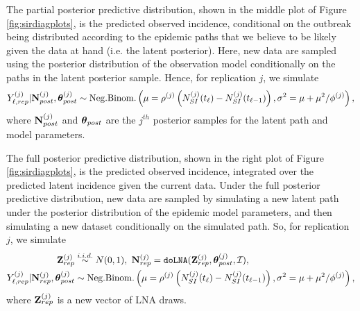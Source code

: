The partial posterior predictive distribution, shown in the middle plot of Figure \ref{fig:sirdiagplots}, is the predicted observed incidence, conditional on the outbreak being distributed according to the epidemic paths that we believe to be likely given the data at hand (i.e. the latent posterior). Here, new data are sampled using the posterior distribution of the observation model conditionally on the paths in the latent posterior sample. Hence, for replication $ j $, we simulate \begin{equation}
\label{eqn:lna_partial_postpred}
Y_{\ell,rep}^{(j)}|\mathbf{N}_{post}^{(j)},\boldsymbol{\theta}_{post}^{(j)} \sim \mathrm{Neg.Binom.}\left (\mu = \rho^{(j)}\left (N_{SI}^{(j)}(t_\ell) - N_{SI}^{(j)}(t_{\ell-1})\right ),\sigma^2 = \mu + \mu^2 / \phi^{(j)} \right ),
\end{equation} 
where $ \mathbf{N}_{post}^{(j)} $ and $ \boldsymbol{\theta}_{post} $ are the $ j^{th} $ posterior samples for the latent path and model parameters. 

The full posterior predictive distribution, shown in the right plot of Figure \ref{fig:sirdiagplots}, is the predicted observed incidence, integrated over the predicted latent incidence given the current data. Under the full posterior predictive distribution, new data are sampled by simulating a new latent path under the posterior distribution of the epidemic model parameters, and then simulating a new dataset conditionally on the simulated path. So, for replication $ j $, we simulate \begin{align}
\label{eqn:lna_full_postpred}
\mathbf{Z}^{(j)}_{rep} &\overset{i.i.d.}{\sim} N(0,1),\ \mathbf{N}^{(j)}_{rep} = \texttt{doLNA}(\mathbf{Z}^{(j)}_{rep},\boldsymbol{\theta}_{post}^{(j)},\mathcal{I}), \\ 
Y_{\ell,rep}^{(j)}|\mathbf{N}_{rep}^{(j)},\boldsymbol{\theta}_{post}^{(j)} &\sim \mathrm{Neg.Binom.}\left (\mu = \rho^{(j)}\left (N_{SI}^{(j)}(t_\ell) - N_{SI}^{(j)}(t_{\ell-1})\right ),\sigma^2 = \mu + \mu^2 / \phi^{(j)} \right ),
\end{align} 
where $ \mathbf{Z}_{rep}^{(j)} $ is a new vector of LNA draws. 

